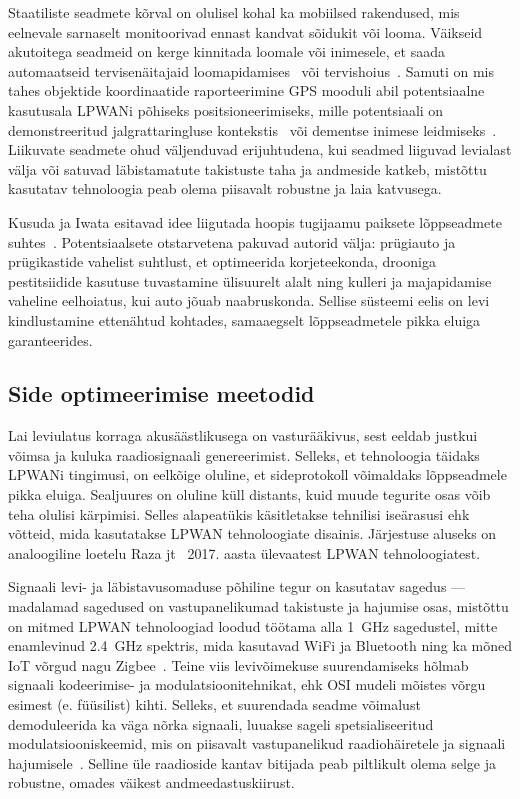 \documentclass[12pt]{article}
\begin{document}
Staatiliste seadmete kõrval on olulisel kohal ka mobiilsed rakendused, mis eelnevale sarnaselt monitoorivad ennast kandvat sõidukit või looma.
Väikseid akutoitega seadmeid on kerge kinnitada loomale või inimesele, et saada automaatseid tervisenäitajaid loomapidamises~\cite{germani, liliu} või tervishoius~\cite{olatinwo, petajajarvi}.
Samuti on mis tahes objektide koordinaatide raporteerimine GPS mooduli abil potentsiaalne kasutusala LPWANi põhiseks positsioneerimiseks, mille potentsiaali on demonstreeritud jalgrattaringluse kontekstis~\cite{kimpark} või dementse inimese leidmiseks~\cite{hadwen}.
Liikuvate seadmete ohud väljenduvad erijuhtudena, kui seadmed liiguvad levialast välja või satuvad läbistamatute takistuste taha ja andmeside katkeb, mistõttu kasutatav tehnoloogia peab olema piisavalt robustne ja laia katvusega.

Kusuda ja Iwata esitavad idee liigutada hoopis tugijaamu paiksete lõppseadmete suhtes~\cite{kusuda}.
Potentsiaalsete otstarvetena pakuvad autorid välja: prügiauto ja prügikastide vahelist suhtlust, et optimeerida korjeteekonda, drooniga pestitsiidide kasutuse tuvastamine ülisuurelt alalt ning kulleri ja majapidamise vaheline eelhoiatus, kui auto jõuab naabruskonda.
Sellise süsteemi eelis on levi kindlustamine ettenähtud kohtades, samaaegselt lõppseadmetele pikka eluiga garanteerides.

\subsection{Side optimeerimise meetodid}

Lai leviulatus korraga akusäästlikusega on vasturääkivus, sest eeldab justkui võimsa ja kuluka raadiosignaali genereerimist.
Selleks, et tehnoloogia täidaks LPWANi tingimusi, on eelkõige oluline, et sideprotokoll võimaldaks lõppseadmele pikka eluiga.
Sealjuures on oluline küll distants, kuid muude tegurite osas võib teha olulisi kärpimisi.
Selles alapeatükis käsitletakse tehnilisi iseärasusi ehk võtteid, mida kasutatakse LPWAN tehnoloogiate disainis.
Järjestuse aluseks on analoogiline loetelu Raza jt~\cite{raza} 2017. aasta ülevaatest LPWAN tehnoloogiatest.

Signaali levi- ja läbistavusomaduse põhiline tegur on kasutatav sagedus — madalamad sagedused on vastupanelikumad takistuste ja hajumise osas, mistõttu on mitmed LPWAN tehnoloogiad loodud töötama alla \SI{1}{\giga\hertz} sagedustel, mitte enamlevinud \SI{2,4}{\giga\hertz} spektris, mida kasutavad WiFi ja Bluetooth ning ka mõned IoT võrgud nagu Zigbee~\cite{bardyn}.
Teine viis levivõimekuse suurendamiseks hõlmab signaali kodeerimise- ja modulatsioonitehnikat, ehk OSI mudeli mõistes võrgu esimest (e. füüsilist) kihti. Selleks, et suurendada seadme võimalust demoduleerida ka väga nõrka signaali, luuakse sageli spetsialiseeritud modulatsiooniskeemid, mis on piisavalt vastupanelikud raadiohäiretele ja signaali hajumisele~\cite{reynders}.
Selline üle raadioside kantav bitijada peab piltlikult olema selge ja robustne, omades väikest andmeedastuskiirust.
\end{document}
